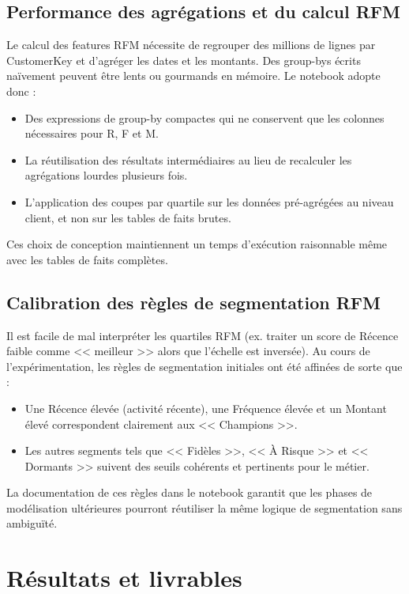 \documentclass[11pt,a4paper]{article}
\begin{document}
\subsection{Performance des agrégations et du calcul RFM}

Le calcul des features RFM nécessite de regrouper des millions de lignes par CustomerKey et d'agréger les dates et les montants. Des group-bys écrits naïvement peuvent être lents ou gourmands en mémoire. Le notebook adopte donc :
\begin{itemize}[noitemsep]
  \item Des expressions de group-by compactes qui ne conservent que les colonnes nécessaires pour R, F et M.
  \item La réutilisation des résultats intermédiaires au lieu de recalculer les agrégations lourdes plusieurs fois.
  \item L'application des coupes par quartile sur les données pré-agrégées au niveau client, et non sur les tables de faits brutes.
\end{itemize}

Ces choix de conception maintiennent un temps d'exécution raisonnable même avec les tables de faits complètes.

\subsection{Calibration des règles de segmentation RFM}

Il est facile de mal interpréter les quartiles RFM (ex. traiter un score de Récence faible comme << meilleur >> alors que l'échelle est inversée). Au cours de l'expérimentation, les règles de segmentation initiales ont été affinées de sorte que :
\begin{itemize}[noitemsep]
  \item Une Récence élevée (activité récente), une Fréquence élevée et un Montant élevé correspondent clairement aux << Champions >>.
  \item Les autres segments tels que << Fidèles >>, << À Risque >> et << Dormants >> suivent des seuils cohérents et pertinents pour le métier.
\end{itemize}

La documentation de ces règles dans le notebook garantit que les phases de modélisation ultérieures pourront réutiliser la même logique de segmentation sans ambiguïté.

\section{Résultats et livrables}
\end{document}
